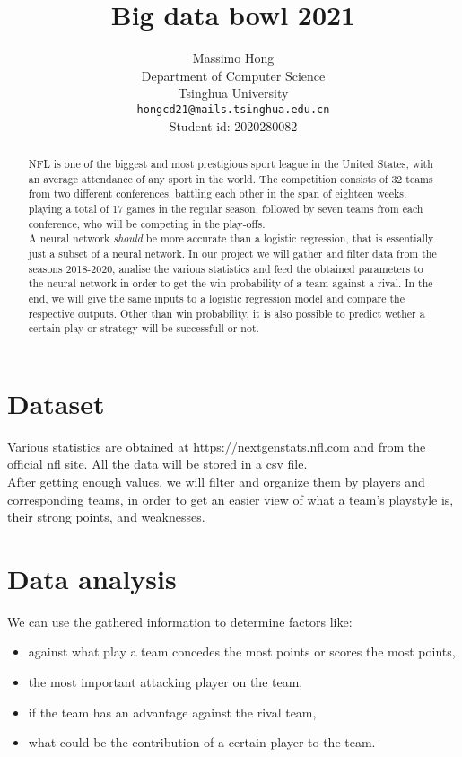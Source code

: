\documentclass{article}
\title{Big data bowl 2021}
\author{
  Massimo Hong\\
  Department of Computer Science\\
  Tsinghua University\\
  \texttt{hongcd21@mails.tsinghua.edu.cn} \\
  Student id: 2020280082}
\begin{document}
\maketitle

\begin{abstract}
  NFL is one of the biggest and most prestigious sport league in the United States, with an average attendance of any sport in the world. The competition consists of 32 teams from two different conferences, battling each other in the span of eighteen weeks, playing a total of 17 games in the regular season, followed by seven teams from each conference, who will be competing in the play-offs.\\
A neural network \textit{should} be more accurate than a logistic regression, that is essentially just a subset of a neural network. 
In our project we will gather and filter data from the seasons 2018-2020, analise the various statistics and feed the obtained parameters to the neural network in order to get the win probability of a team against a rival. In the end, we will give the same inputs to a logistic regression model and compare the respective outputs. Other than win probability, it is also possible to predict wether a certain play or strategy will be successfull or not.
\end{abstract}

\section{Dataset}
Various statistics are obtained at \url{https://nextgenstats.nfl.com} and from the official nfl site. All the data will be stored in a csv file.\\ After getting enough values, we will filter and organize them by players and corresponding teams, in order to get an easier view of 
what a team's playstyle is, their strong points, and weaknesses.
\section{Data analysis}
We can use the gathered information to determine factors like:
\begin{itemize}
\item against what play a team concedes the most points or scores the most points, 
\item the most important attacking player on the team,
\item if the team has an advantage against the rival team,
\item what could be the contribution of a certain player to the team.
\end{itemize}
\end{document}
